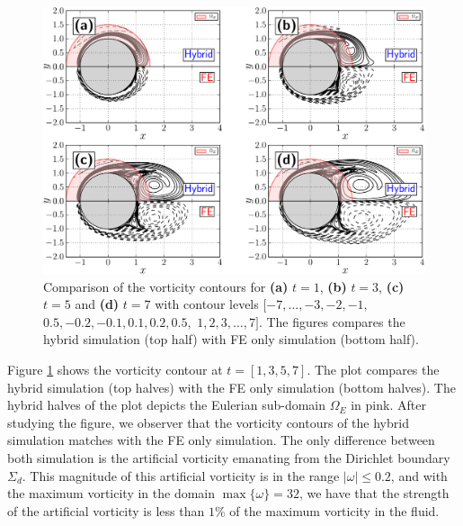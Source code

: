 	\begin{figure}[!p]
	\centering
	\includegraphics[width=\linewidth]{./figures/validation/isc/hybrid_cylinder_contourComparison_tStarting-crop.pdf}
	\caption{Comparison of the vorticity contours for \textbf{(a)} $t=1$, \textbf{(b)} $t=3$, \textbf{(c)} $t=5$ and \textbf{(d)} $t=7$ with contour levels $[-7,..., -3, -2, -1,$ $0.5, -0.2, -0.1, 0.1, 0.2, 0.5,$ $1, 2, 3,..., 7]$. The figures compares the hybrid simulation (top half) with FE only simulation (bottom half).}
	\label{fig:hybrid_cylinder_contourComparison_tStarting}
	\end{figure}

Figure \ref{fig:hybrid_cylinder_contourComparison_tStarting} shows the vorticity contour at $t = [1,3,5,7]$. The plot compares the hybrid simulation (top halves) with the FE only simulation (bottom halves). The hybrid halves of the plot depicts the Eulerian sub-domain $\Omega_E$ in pink. After studying the figure, we observer that the vorticity contours of the hybrid simulation matches with the FE only simulation. The only difference between both simulation is the artificial vorticity emanating from the Dirichlet boundary $\Sigma_d$. This magnitude of this artificial vorticity is in the range $|\omega|\leqslant0.2$, and with the maximum vorticity in the domain $\max\{\omega\}=32$, we have that the strength of the artificial vorticity is less than $1\%$ of the maximum vorticity in the fluid.

